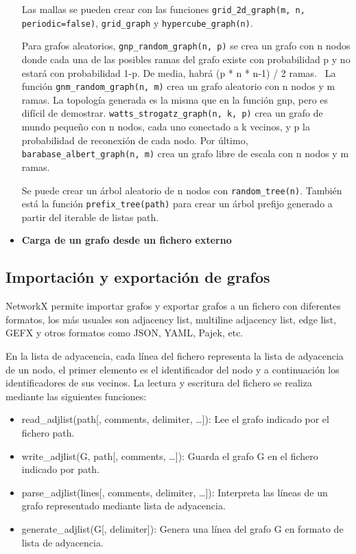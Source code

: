 \begin{itemize}
Las mallas se pueden crear con las funciones \texttt{grid\_2d\_graph(m, n, periodic=false)}, \texttt{grid\_graph} y \texttt{hypercube\_graph(n)}.

Para grafos aleatorios, \texttt{gnp\_random\_graph(n, p)} se crea un grafo con n nodos donde cada una de las posibles ramas del grafo existe con probabilidad p y no estará con probabilidad 1-p.  De media, habrá (p * n * n-1) / 2  ramas. 
 \
La función \texttt{gnm\_random\_graph(n, m)} crea un grafo aleatorio con n nodos y m ramas. La topología generada es la misma que en la función gnp, pero es difícil de demostrar.  \texttt{watts\_strogatz\_graph(n, k, p)} crea un grafo de mundo pequeño con n nodos, cada uno conectado a k vecinos, y p la probabilidad de reconexión de cada nodo. Por último, \texttt{barabase\_albert\_graph(n, m)} crea un grafo libre de escala con n nodos y m ramas.

Se puede crear un árbol aleatorio de n nodos con \texttt{random\_tree(n)}. También está la función \texttt{prefix\_tree(path)} para crear un árbol prefijo generado a partir del iterable de listas path.

\item \textbf{Carga de un grafo desde un fichero externo}
\end{itemize}

\subsection{Importación y exportación de grafos}
NetworkX permite importar grafos y exportar grafos a un fichero con diferentes formatos, los más usuales son adjacency list, multiline adjacency list, edge list, GEFX y otros formatos como JSON, YAML, Pajek, etc.

En la lista de adyacencia, cada línea del fichero representa la lista de adyacencia de un nodo, el primer elemento es el identificador del nodo y a continuación los identificadores de sus vecinos.
La lectura y escritura del fichero se realiza mediante las siguientes funciones:
\begin{itemize}
\item read\_adjlist(path[, comments, delimiter, …]): Lee el grafo indicado por el fichero path.
\item write\_adjlist(G, path[, comments, …]): Guarda el grafo G en el fichero indicado por path.
\item parse\_adjlist(lines[, comments, delimiter, …]): Interpreta las líneas de un grafo representado mediante lista de adyacencia.
\item generate\_adjlist(G[, delimiter]): Genera una línea del grafo G en formato de lista de adyacencia.
\end{itemize}

